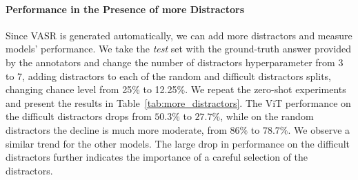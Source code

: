 \documentclass[letterpaper]{article} \usepackage{aaai23}  \usepackage{times}  \usepackage{helvet}  \usepackage{courier}  \usepackage[hyphens]{url}  \usepackage{graphicx} \urlstyle{rm} \def\UrlFont{\rm}  \usepackage{natbib}  \usepackage{caption} \frenchspacing  \setlength{\pdfpagewidth}{8.5in}  \setlength{\pdfpageheight}{11in}  \usepackage{algorithm}
\begin{document}
\paragraph{Performance in the Presence of more Distractors}Since VASR is generated  automatically, we can add more distractors and measure models' performance. We take the \textit{test} set with the ground-truth answer provided by the annotators and change the number of distractors hyperparameter from 3 to 7, adding distractors to each of the random and difficult distractors splits, changing chance level from 25\% to 12.25\%. 
We repeat the zero-shot experiments and present the results in Table~\ref{tab:more_distractors}. The ViT performance on the difficult distractors drops from $50.3\%$ to $27.7\%$, while on the random distractors the decline is much more moderate, from $86\%$ to $78.7\%$. We observe a similar trend for the other models. 
The large drop in performance on the difficult distractors further indicates the importance of a careful selection of the distractors. 
\end{document}
